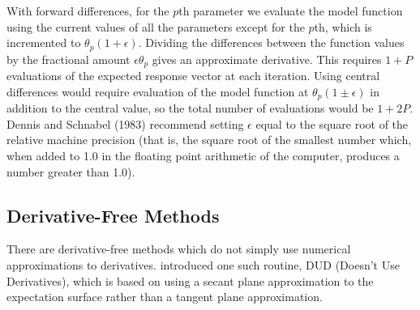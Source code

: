 With forward differences, for the $p$th
parameter we evaluate the model function
using the current values of all the
parameters except for the $p$th, which is incremented
to $\theta_p ( 1 + \epsilon )$.
Dividing the differences between the function values
by the fractional amount $\epsilon \theta_{p}$
gives an approximate derivative.
This requires $1 + P$ evaluations of the expected response
vector at each iteration.
Using central differences would require evaluation of the model
function at
$\theta_p ( 1 \pm \epsilon )$ in addition to the central
value, so the total number of evaluations would be
$1 + 2 P$.
Dennis and Schnabel (1983) recommend setting $\epsilon$ equal to the
square root of the relative machine precision (that is, the square
root of the smallest number which, when added to 1.0 in
the floating point arithmetic of the computer, produces a number
greater than 1.0).
\subsection{Derivative-Free Methods}

There are derivative-free methods which do not simply use
numerical approximations to derivatives.
 introduced one such routine, DUD
(Doesn't Use Derivatives), which is
based on using a secant plane approximation to the
expectation surface rather than a tangent plane approximation.

